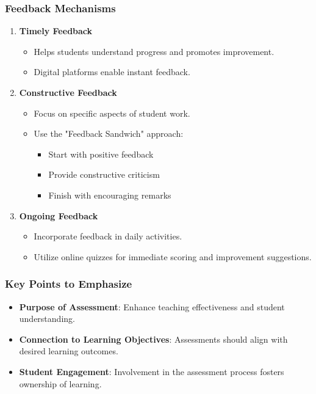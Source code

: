 \documentclass[aspectratio=169]{beamer}
\begin{document}
\begin{frame}[fragile]
    \frametitle{Feedback Mechanisms}
    \begin{enumerate}
        \item \textbf{Timely Feedback}
            \begin{itemize}
                \item Helps students understand progress and promotes improvement.
                \item Digital platforms enable instant feedback.
            \end{itemize}
        
        \item \textbf{Constructive Feedback}
            \begin{itemize}
                \item Focus on specific aspects of student work.
                \item Use the "Feedback Sandwich" approach:
                    \begin{itemize}
                        \item Start with positive feedback
                        \item Provide constructive criticism
                        \item Finish with encouraging remarks
                    \end{itemize}
            \end{itemize}

        \item \textbf{Ongoing Feedback}
            \begin{itemize}
                \item Incorporate feedback in daily activities.
                \item Utilize online quizzes for immediate scoring and improvement suggestions.
            \end{itemize}
    \end{enumerate}
\end{frame}

\begin{frame}[fragile]
    \frametitle{Key Points to Emphasize}
    \begin{itemize}
        \item \textbf{Purpose of Assessment}: Enhance teaching effectiveness and student understanding.
        \item \textbf{Connection to Learning Objectives}: Assessments should align with desired learning outcomes.
        \item \textbf{Student Engagement}: Involvement in the assessment process fosters ownership of learning.
    \end{itemize}
\end{frame}
\end{document}
